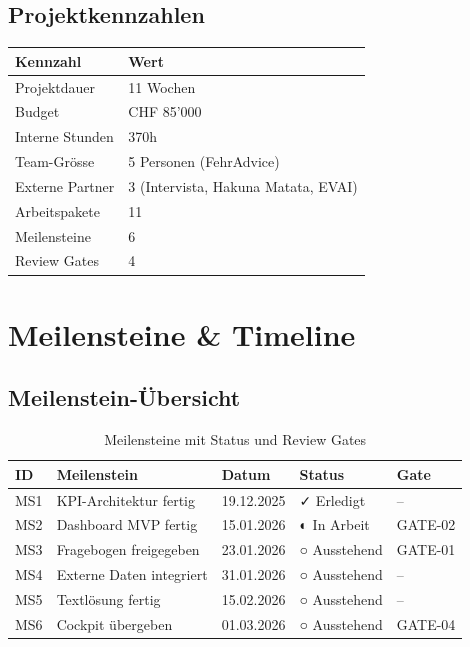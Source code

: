 \documentclass[11pt,a4paper]{article}
\begin{document}
\subsection{Projektkennzahlen}

\begin{table}[h]
\centering
\begin{tabular}{ll}
\toprule
\textbf{Kennzahl} & \textbf{Wert} \\
\midrule
Projektdauer & 11 Wochen \\
Budget & CHF 85'000 \\
Interne Stunden & 370h \\
Team-Grösse & 5 Personen (FehrAdvice) \\
Externe Partner & 3 (Intervista, Hakuna Matata, EVAI) \\
Arbeitspakete & 11 \\
Meilensteine & 6 \\
Review Gates & 4 \\
\bottomrule
\end{tabular}
\end{table}

\newpage

\section{Meilensteine \& Timeline}

\subsection{Meilenstein-Übersicht}

\begin{table}[h]
\centering
{}
\begin{tabular}{C{1cm}L{5cm}C{2.5cm}C{2cm}C{2cm}}
\toprule
\textbf{ID} & \textbf{Meilenstein} & \textbf{Datum} & \textbf{Status} & \textbf{Gate} \\
\midrule
MS1 & KPI-Architektur fertig & 19.12.2025 & \textcolor{fagreen}{✓ Erledigt} & -- \\
MS2 & Dashboard MVP fertig & 15.01.2026 & \textcolor{faorange}{◐ In Arbeit} & GATE-02 \\
MS3 & Fragebogen freigegeben & 23.01.2026 & ○ Ausstehend & GATE-01 \\
MS4 & Externe Daten integriert & 31.01.2026 & ○ Ausstehend & -- \\
MS5 & Textlösung fertig & 15.02.2026 & ○ Ausstehend & -- \\
MS6 & Cockpit übergeben & 01.03.2026 & ○ Ausstehend & GATE-04 \\
\bottomrule
\end{tabular}
\caption{Meilensteine mit Status und Review Gates}
\end{table}
\end{document}
